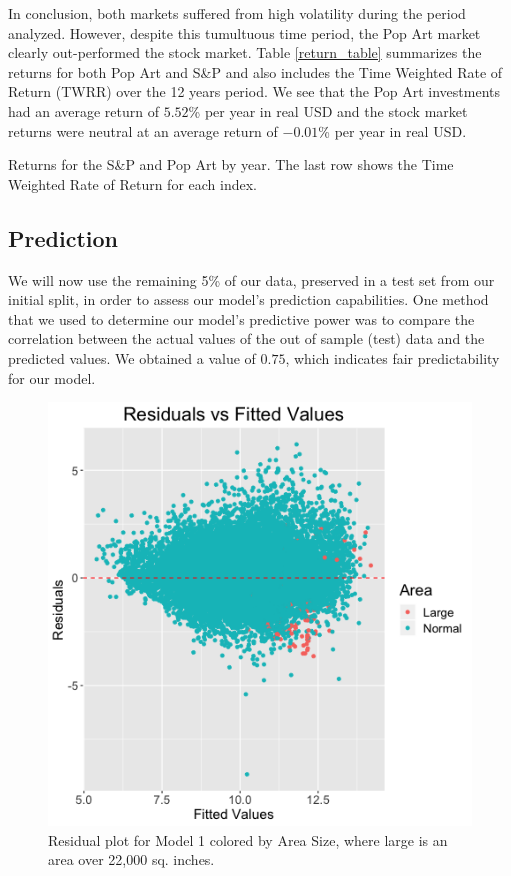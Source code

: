 \documentclass[]{asaproc}\usepackage[]{graphicx}\usepackage[]{color}
\begin{document}
In conclusion, both markets suffered from high volatility during the period analyzed. However, despite this tumultuous time period, the Pop Art market clearly out-performed the stock market. Table \ref{return_table} summarizes the returns for both Pop Art and S\&P and also includes the Time Weighted Rate of Return (TWRR) over the 12 years period. We see that the Pop Art investments had an average return of $5.52$\% per year in real USD and the stock market returns were neutral at an average return of $-0.01$\% per year in real USD.

\begin{table}[!ht]
\caption{\enspace Returns for the S\&P and Pop Art by year. The last row shows the Time Weighted Rate of Return for each index.}\label{return_table}
\footnotesize 
\end{table}

\subsection{Prediction}

We will now use the remaining 5\% of our data, preserved in a test set from our initial split, in order to assess our model's prediction capabilities. One method that we used to determine our model's predictive power was to compare the correlation between the actual values of the out of sample (test) data and the predicted values. We obtained a value of $0.75$, which indicates fair predictability for our model.

\begin{figure}[!ht]

\includegraphics[scale = 0.5]{residuals}
\caption{Residual plot for Model 1 colored by Area Size, where large is an area over 22,000 sq. inches.}
\label{residuals}
\end{figure}
\end{document}
